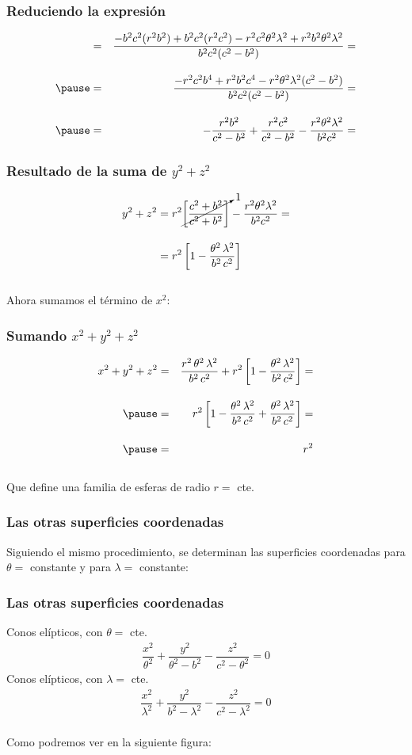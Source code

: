 \begin{frame}
\frametitle{Reduciendo la expresión}
\begin{eqnarray*}
&=& \dfrac{-b^{2} c^{2} (r^{2} b^{2}) + b^{2} c^{2} (r^{2} c^{2}) - r^{2} c^{2} \theta^{2} \lambda^{2} + r^{2} b^{2} \theta^{2} \lambda^{2}}{b^{2} c^{2} (c^{2} - b^{2})} = \\[1em] \pause
&=& \dfrac{-r^{2} c^{2} b^{4} + r^{2} b^{2} c^{4} - r^{2} \theta^{2} \lambda^{2} (c^{2} - b^{2})}{b^{2} c^{2} (c^{2} - b^{2})} = \\[1em] \pause
&=& - \dfrac{r^{2} b^{2}}{c^{2} - b^{2}} + \dfrac{r^{2} c^{2}}{c^{2} - b^{2}} - \dfrac{r^{2} \theta^{2} \lambda^{2}}{b^{2} c^{2}} =
\end{eqnarray*}
\end{frame}
\begin{frame}
\frametitle{Resultado de la suma de $y^{2} + z^{2}$}
\begin{align*}
y^{2} + z^{2} &= r^{2} \cancelto{1}{\left[ \dfrac{c^{2} + b^{2}}{c^{2} + b^{2}} \right]} - \dfrac{r^{2} \theta^{2} \lambda^{2}}{b^{2} c^{2}} = \\[1em]
&= r^{2} \left[ 1 - \dfrac{\theta^{2} \, \lambda^{2}}{b^{2} \, c^{2}} \right]
\end{align*}
\\
\bigskip
\pause
Ahora sumamos el término de $x^{2}$:
\end{frame}
\begin{frame}
\frametitle{Sumando $x^{2} + y^{2} + z^{2}$}
\begin{eqnarray*}
x^{2} + y^{2} + z^{2} &=& \dfrac{r^{2} \, \theta^{2} \, \lambda^{2}}{b^{2} \, c^{2}} + r^{2} \left[ 1 - \dfrac{\theta^{2} \, \lambda^{2}}{b^{2} \, c^{2}} \right] = \\[1em] \pause
&=& r^{2} \left[ 1 - \dfrac{\theta^{2} \, \lambda^{2}}{b^{2} \, c^{2}} + \dfrac{\theta^{2} \, \lambda^{2}}{b^{2} \, c^{2}} \right] = \\[1em] \pause
&=& r^{2}
\end{eqnarray*}
\\
\bigskip
\pause
Que define una familia de esferas de radio $r =$ cte.
\end{frame}
\begin{frame}
\frametitle{Las otras superficies coordenadas}
Siguiendo el mismo procedimiento, se determinan las superficies coordenadas para $\theta=$ constante y para $\lambda=$ constante:
\end{frame}
\begin{frame}
\frametitle{Las otras superficies coordenadas}
Conos elípticos, con $\theta=$ cte.
\begin{align*}
\dfrac{x^{2}}{\theta^{2}} + \dfrac{y^{2}}{\theta^{2} - b^{2}} - \dfrac{z^{2}}{c^{2} - \theta^{2}} = 0
\end{align*}
\pause
Conos elípticos, con $\lambda=$ cte.
\begin{align*}
\dfrac{x^{2}}{\lambda^{2}} + \dfrac{y^{2}}{b^{2} - \lambda^{2}} - \dfrac{z^{2}}{c^{2} - \lambda^{2}} = 0
\end{align*}
\\
\bigskip
Como podremos ver en la siguiente figura:
\end{frame}
